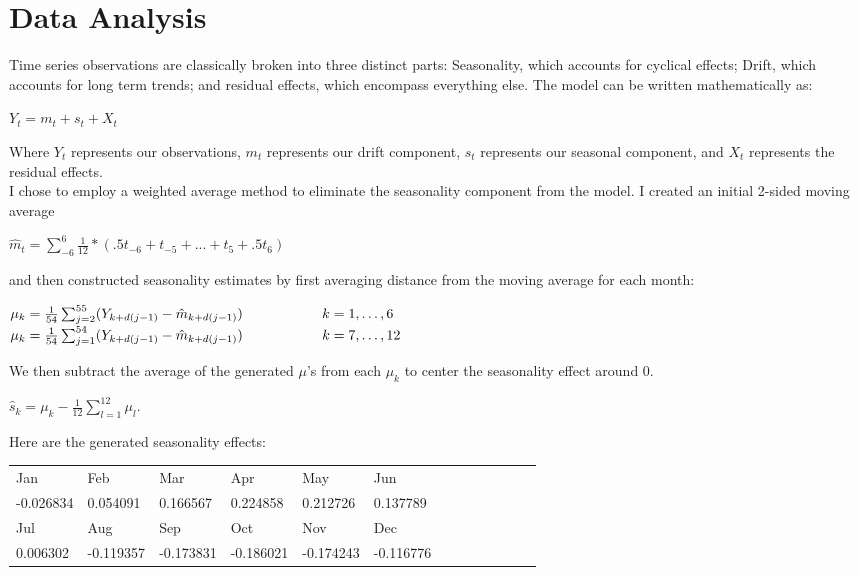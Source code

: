 \documentclass[twoside,12pt]{article}
\begin{document}
\part{Data Analysis}
Time series observations are classically broken into three distinct parts: Seasonality, which accounts for cyclical effects; Drift, which accounts for long term trends; and residual effects, which encompass everything else. The model can be written mathematically as:\begin{center}$Y_{t} = m_{t} + s_{t} + X_{t}$
\end{center}
Where $Y_{t}$ represents our observations, $m_{t}$ represents our drift component, $s_{t}$ represents our seasonal component, and $X_{t}$ represents the residual effects. \\
I chose to employ a weighted average method to eliminate the seasonality component from the model. I created an initial 2-sided moving average\begin{center} $\hat m_{t} = \sum_{-6}^6 \frac{1}{12}*(.5t_{-6} + t_{-5} + ... + t_{5} + .5t_{6})$\end{center} and then constructed seasonality estimates by first averaging distance from the moving average for each month:\begin{center} $\mu_{k} = \frac{1}{54}\sum_{j=2}^{55}(Y_{k+d(j-1)} - \hat m_{k+d(j-1)}) \hspace{20 mm} k = 1,\ldots,6$ \\
$\mu_{k} = \frac{1}{54}\sum_{j=1}^{54}(Y_{k+d(j-1)} - \hat m_{k+d(j-1)}) \hspace{20 mm} k = 7,\ldots,12$\end{center}
We then subtract the average of the generated $\mu$'s from each $\mu_{k}$ to center the seasonality effect around $0$.\begin{center} $\hat s_{k} = \mu_{k} - \frac{1}{12}\sum_{l=1}^{12}\mu_{l}$.\end{center}
Here are the generated seasonality effects:
\begin{table}[ht]
\begin{tabular}{lllllllllllll}
  \hline
Jan & Feb & Mar & Apr & May & Jun \\ -0.026834 & 0.054091 & 0.166567 & 0.224858 & 0.212726 & 0.137789 \\ \hline Jul & Aug & Sep & Oct & Nov & Dec \\ 0.006302 & -0.119357 & -0.173831 & -0.186021 & -0.174243 & -0.116776 \\ 
   \hline
\end{tabular}
\end{table}
\end{document}
